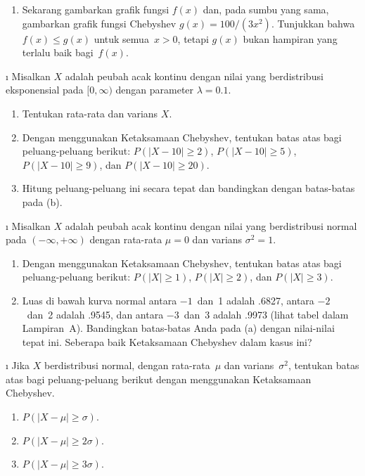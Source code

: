 {\begin{LJSItem}
\begin{enumerate}
\item Sekarang gambarkan grafik fungsi $f(x)$ dan, pada sumbu yang sama, gambarkan grafik
fungsi Chebyshev $g(x) = 100/(3x^2)$.  Tunjukkan bahwa $f(x) \leq g(x)$ untuk semua~$x >
0$, tetapi $g(x)$ bukan hampiran yang terlalu baik bagi~$f(x)$.
\end{enumerate}

\i\label{exer 8.2.100} Misalkan $X$ adalah peubah acak kontinu dengan nilai yang berdistribusi
eksponensial pada $[0,\infty)$ dengan parameter $\lambda = 0.1$.
\begin{enumerate}
\item Tentukan rata-rata dan varians $X$.

\item Dengan menggunakan Ketaksamaan Chebyshev, tentukan batas atas bagi
peluang-peluang berikut: $P(|X - 10| \geq 2)$, $P(|X - 10| \geq 5)$, $P(|X - 10| \geq
9)$, dan $P(|X - 10| \geq 20)$.

\item Hitung peluang-peluang ini secara tepat dan bandingkan dengan batas-batas pada
(b).
\end{enumerate}
\i\label{exer 8.2.101} Misalkan $X$ adalah peubah acak kontinu dengan nilai yang berdistribusi
normal pada $(-\infty,+\infty)$ dengan rata-rata $\mu = 0$ dan varians $\sigma^2 = 1$.
\begin{enumerate}
\item Dengan menggunakan Ketaksamaan Chebyshev, tentukan batas atas bagi
peluang-peluang berikut: $P(|X| \geq 1)$, $P(|X| \geq 2)$, dan $P(|X| \geq 3)$.

\item Luas di bawah kurva normal antara $-1$~dan~1 adalah .6827, antara
$-2$~dan~2 adalah .9545, dan antara $-3$~dan~3 adalah .9973 (lihat tabel dalam
Lampiran~A).  Bandingkan batas-batas Anda pada (a) dengan
nilai-nilai tepat ini.  Seberapa baik Ketaksamaan Chebyshev dalam kasus ini?
\end{enumerate}

\i\label{exer 8.2.102} Jika $X$ berdistribusi normal, dengan rata-rata~$\mu$ dan
varians~$\sigma^2$, tentukan batas atas bagi peluang-peluang berikut dengan menggunakan Ketaksamaan
Chebyshev.
\begin{enumerate}
\item $P(|X - \mu| \geq \sigma)$.

\item $P(|X - \mu| \geq 2\sigma)$.

\item $P(|X - \mu| \geq 3\sigma)$.


\end{enumerate}
\end{LJSItem}}
